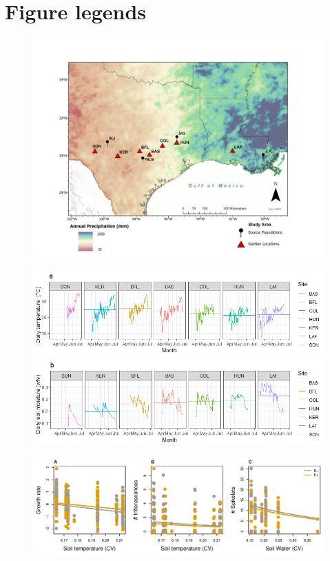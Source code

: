 \documentclass[11pt]{article}
\begin{document}
\section*{Figure legends}
\begin{figure}[H]
  \begin{center}
   \includegraphics[width=0.99\linewidth]{Figures/Study_site.jpg}
  \caption{}
  \label{fig:site}
  \end{center}
\end{figure}

\begin{figure}[H]
  \begin{center}
   \includegraphics[width=0.98\linewidth]{Figures/Temperature.png}
  \includegraphics[width=0.98\linewidth]{Figures/Soil_moisture.png}
  \caption{}
  \label{fig:gradient}
  \end{center}
\end{figure}


\begin{figure}[H]
  \begin{center}
   \includegraphics[width=0.98\linewidth]{Figures/Bestmodels.pdf}
  \caption{}
  \label{fig:gradient}
  \end{center}
\end{figure}
\end{document}
